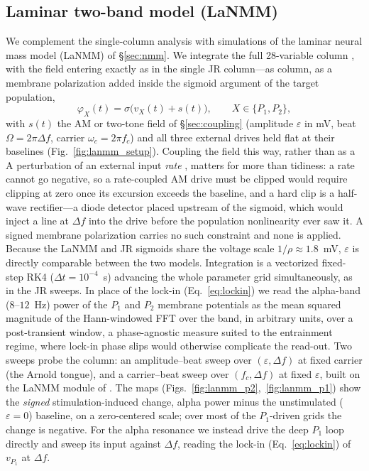 \documentclass[11pt,a4paper]{article}
\newcommand{\Sig}{\sigma}
\providecommand{\DIFaddtex}[1]{{\protect\color{blue} \sf #1}} %
\providecommand{\DIFdeltex}[1]{{\protect\color{red} \scriptsize #1}} %
\providecommand{\DIFaddbegin}{} %
\providecommand{\DIFaddend}{} %
\providecommand{\DIFdelbegin}{} %
\providecommand{\DIFdelend}{} %
\providecommand{\DIFadd}[1]{\texorpdfstring{\DIFaddtex{#1}}{#1}} %
\providecommand{\DIFdel}[1]{\texorpdfstring{\DIFdeltex{#1}}{}} %
\begin{document}
\subsection{Laminar two-band model (LaNMM)}
We complement the single-column analysis with simulations of the laminar neural
mass model (LaNMM) of \S\ref{sec:nmm}. We integrate the full 28-variable column
\cite{ruffini2025cfc,sanchezTodo2023}, with the field entering exactly as in the single
JR \DIFdelbegin \DIFdel{column---as }\DIFdelend \DIFaddbegin \DIFadd{column, as }\DIFaddend a membrane polarization added inside the sigmoid argument of the target
population,
\begin{equation}
\varphi_X(t)=\Sig\!\big(v_X(t)+s(t)\big),\qquad X\in\{P_1,P_2\},
\label{eq:lanmm_drive}
\end{equation}
with $s(t)$ the AM or two-tone field of \S\ref{sec:coupling} (amplitude $\varepsilon$ in
mV, beat $\Omega=2\pi\Delta f$, carrier $\omega_c=2\pi f_c$) and all three external drives
held flat at their baselines (Fig.~\ref{fig:lanmm_setup}). \DIFdelbegin \DIFdel{Coupling the field this way,
rather than as a }\DIFdelend \DIFaddbegin \DIFadd{A }\DIFaddend perturbation of an external
input \emph{rate} \DIFdelbegin \DIFdel{, matters for more than
tidiness: a rate cannot go negative, so a rate-coupled AM drive must be clipped }\DIFdelend \DIFaddbegin \DIFadd{would require clipping }\DIFaddend at zero
once its excursion exceeds the baseline, and a hard clip is a half-wave rectifier---a
diode detector placed upstream of the sigmoid, which would inject a line at $\Delta f$
into the drive before the population nonlinearity ever saw it. A signed membrane
polarization carries no such constraint and none is applied. Because the LaNMM and JR
sigmoids share the voltage scale $1/\rho\approx1.8$~mV, $\varepsilon$ is directly
comparable between the two models. Integration is a vectorized fixed-step RK4
($\Delta t=10^{-4}$~s) advancing the whole parameter grid simultaneously, as in the JR
sweeps. In place of the lock-in (Eq.~\eqref{eq:lockin}) we read the
alpha-band ($8$--$12$~Hz) power of the $P_1$ and $P_2$ membrane potentials as the mean
squared magnitude of the Hann-windowed FFT over the band, in arbitrary units, over a
post-transient window, a phase-agnostic measure suited to the entrainment regime, where
lock-in phase slips would otherwise complicate the read-out. Two sweeps probe the column: an amplitude--beat sweep over
$(\varepsilon,\Delta f)$ at fixed carrier (the Arnold tongue), and a carrier--beat sweep
over $(f_c,\Delta f)$ at fixed $\varepsilon$, built on the LaNMM module of
\cite{ruffini2025cfc}. The maps
(Figs.~\ref{fig:lanmm_p2},~\ref{fig:lanmm_p1}) show the \emph{signed} stimulation-induced
change, alpha power minus the unstimulated ($\varepsilon=0$) baseline, on a zero-centered
scale; over most of the $P_1$-driven grids the change is negative. For the
alpha resonance we instead drive the deep $P_1$ loop directly and sweep its input against
$\Delta f$, reading the lock-in (Eq.~\eqref{eq:lockin}) of $v_{P_1}$ at $\Delta f$.
\end{document}
